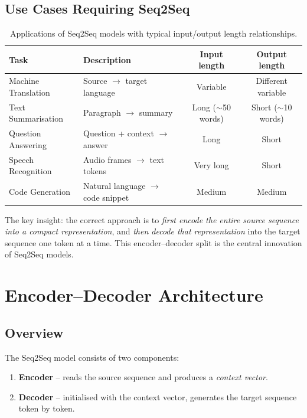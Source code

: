 \documentclass[12pt,a4paper]{article}
\begin{document}
\subsection{Use Cases Requiring Seq2Seq}

\begin{table}[htbp]
  \centering
  \caption{Applications of Seq2Seq models with typical input/output length relationships.}
  \label{tab:usecases}
  \begin{tabular}{@{}llcc@{}}
    \toprule
    \textbf{Task} & \textbf{Description} & \textbf{Input length} & \textbf{Output length} \\
    \midrule
    Machine Translation & Source $\to$ target language & Variable & Different variable \\
    Text Summarisation  & Paragraph $\to$ summary      & Long ($\sim$50 words) & Short ($\sim$10 words) \\
    Question Answering  & Question + context $\to$ answer & Long & Short \\
    Speech Recognition  & Audio frames $\to$ text tokens & Very long & Short \\
    Code Generation     & Natural language $\to$ code snippet & Medium & Medium \\
    \bottomrule
  \end{tabular}
\end{table}

The key insight: the correct approach is to \emph{first encode the entire source sequence into a
compact representation}, and \emph{then decode that representation} into the target sequence one
token at a time. This encoder--decoder split is the central innovation of Seq2Seq models.

\section{Encoder--Decoder Architecture}
\label{sec:architecture}

\subsection{Overview}

The Seq2Seq model consists of two components:
\begin{enumerate}[noitemsep]
  \item \textbf{Encoder} -- reads the source sequence and produces a \emph{context vector}.
  \item \textbf{Decoder} -- initialised with the context vector, generates the target sequence
        token by token.
\end{enumerate}
\end{document}
